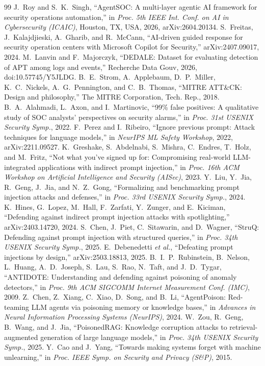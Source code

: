 \documentclass[conference]{IEEEtran}
\begin{document}
\begin{thebibliography}{99}
 J.~Roy and S.~K.~Singh, ``AgentSOC: A multi-layer agentic AI framework for security operations
automation,'' in \emph{Proc. 5th IEEE Int. Conf. on AI in Cybersecurity (ICAIC)}, Houston, TX, USA, 2026,
arXiv:2604.20134.
 S.~Freitas, J.~Kalajdjieski, A.~Gharib, and R.~McCann, ``AI-driven guided response for security
operation centers with Microsoft Copilot for Security,'' arXiv:2407.09017, 2024.
 M.~Lanvin and F.~Majorczyk, ``DEDALE: Dataset for evaluating detection of APT among logs and
events,'' Recherche Data Gouv, 2026, doi:10.57745/Y5JLDG.
 B.~E.~Strom, A.~Applebaum, D.~P.~Miller, K.~C.~Nickels, A.~G.~Pennington, and C.~B.~Thomas,
``MITRE ATT\&CK: Design and philosophy,'' The MITRE Corporation, Tech. Rep., 2018.
 B.~A.~Alahmadi, L.~Axon, and I.~Martinovic, ``99\% false positives: A qualitative study of SOC
analysts' perspectives on security alarms,'' in \emph{Proc. 31st USENIX Security Symp.}, 2022.
 F.~Perez and I.~Ribeiro, ``Ignore previous prompt: Attack techniques for language models,'' in
\emph{NeurIPS ML Safety Workshop}, 2022, arXiv:2211.09527.
 K.~Greshake, S.~Abdelnabi, S.~Mishra, C.~Endres, T.~Holz, and M.~Fritz, ``Not what you've signed
up for: Compromising real-world LLM-integrated applications with indirect prompt injection,'' in \emph{Proc. 16th
ACM Workshop on Artificial Intelligence and Security (AISec)}, 2023.
 Y.~Liu, Y.~Jia, R.~Geng, J.~Jia, and N.~Z.~Gong, ``Formalizing and benchmarking prompt injection
attacks and defenses,'' in \emph{Proc. 33rd USENIX Security Symp.}, 2024.
 K.~Hines, G.~Lopez, M.~Hall, F.~Zarfati, Y.~Zunger, and E.~Kiciman, ``Defending against
indirect prompt injection attacks with spotlighting,'' arXiv:2403.14720, 2024.
 S.~Chen, J.~Piet, C.~Sitawarin, and D.~Wagner, ``StruQ: Defending against prompt injection with
structured queries,'' in \emph{Proc. 34th USENIX Security Symp.}, 2025.
 E.~Debenedetti \emph{et al.}, ``Defeating prompt injections by design,'' arXiv:2503.18813, 2025.
 B.~I.~P.~Rubinstein, B.~Nelson, L.~Huang, A.~D.~Joseph, S.~Lau, S.~Rao, N.~Taft, and
J.~D.~Tygar, ``ANTIDOTE: Understanding and defending against poisoning of anomaly detectors,'' in \emph{Proc. 9th
ACM SIGCOMM Internet Measurement Conf. (IMC)}, 2009.
 Z.~Chen, Z.~Xiang, C.~Xiao, D.~Song, and B.~Li, ``AgentPoison: Red-teaming LLM agents via
poisoning memory or knowledge bases,'' in \emph{Advances in Neural Information Processing Systems (NeurIPS)}, 2024.
 W.~Zou, R.~Geng, B.~Wang, and J.~Jia, ``PoisonedRAG: Knowledge corruption attacks to
retrieval-augmented generation of large language models,'' in \emph{Proc. 34th USENIX Security Symp.}, 2025.
 Y.~Cao and J.~Yang, ``Towards making systems forget with machine unlearning,'' in \emph{Proc.
IEEE Symp. on Security and Privacy (S\&P)}, 2015.
\end{thebibliography}
\end{document}
